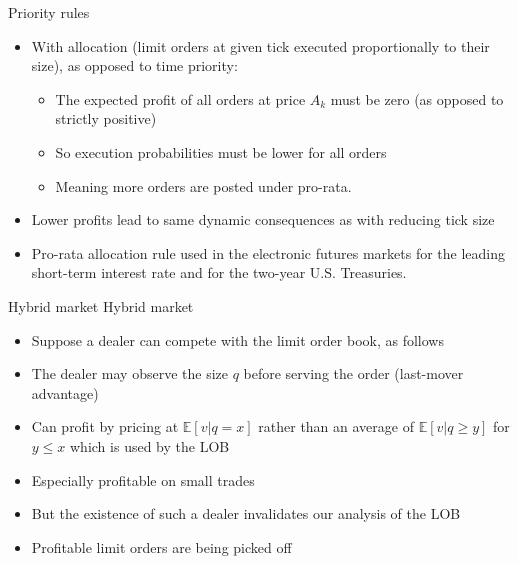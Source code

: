 \documentclass[english,10pt
,aspectratio=169
]{beamer}
\begin{document}
\begin{frame}{Priority rules}
	\begin{itemize}
		\item With  allocation (limit orders at given tick executed proportionally to their size), as opposed to \alert{time priority}:
		\begin{itemize}
			\item The expected profit of all orders at price $A_k$ must be zero (as opposed to strictly positive)
			\item So execution probabilities must be lower for all orders
			\item Meaning more orders are posted under pro-rata.
		\end{itemize}
		\item Lower profits lead to same dynamic consequences as with reducing tick size
		\item Pro-rata allocation rule used in the electronic futures markets for the leading short-term interest rate and for the two-year U.S. Treasuries.
	\end{itemize}
\end{frame}


\begin{frame}{Hybrid market}
	Hybrid market
	\begin{itemize}
		\item Suppose a dealer can compete with the limit order book, as follows
		\item The dealer may observe the size $q$ before serving the order (last-mover advantage)
		\item Can profit by pricing at $\mathbb{E}[v|q=x]$ rather than an average of $\mathbb{E}[v|q \geq y]$ for $y \leq x$ which is used by the LOB
		\item Especially profitable on small trades
		\item But the existence of such a dealer invalidates our analysis of the LOB
		\item Profitable limit orders are being picked off
	\end{itemize}
\end{frame}
\end{document}
